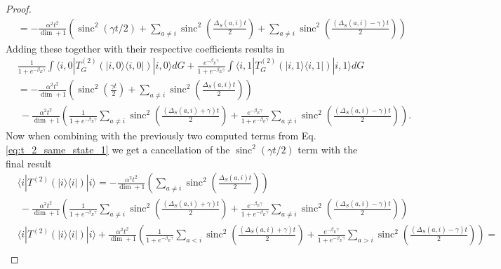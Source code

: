 \documentclass{article}
\newcommand{\ket}[1]{|#1\rangle}
\newcommand{\bra}[1]{\langle #1|}
\newcommand{\ketbra}[2]{| #1\rangle\! \langle #2|}
\newcommand{\parens}[1]{\left( #1 \right)}
\DeclareMathOperator{\sinc}{sinc}
\begin{document}
\begin{proof}
\begin{align}
        &=- \frac{\alpha^2 t^2}{\dim  + 1} \parens{\sinc^2 (\gamma t / 2) + \sum_{a \neq i} \sinc^2 \left( \frac{\Delta_S(a, i) t}{2} \right) + \sum_{a \neq i} \sinc^2\parens{\frac{(\Delta_S(a, i) - \gamma)t}{2}} }
    \end{align}
    Adding these together with their respective coefficients results in
    \begin{align}
        &\frac{1}{1 + e^{-\beta_E \gamma}} \int \bra{i, 0} T^{(2)}_G (\ketbra{i, 0}{i, 0}) \ket{i, 0} dG + \frac{e^{-\beta_E \gamma}}{1 + e^{-\beta_E \gamma}} \int \bra{i, 1} T^{(2)}_G (\ketbra{i, 1}{i, 1}) \ket{i, 1} dG \\
        &= - \frac{\alpha^2 t^2}{\dim + 1} \left( \sinc^2\parens{\frac{\gamma t}{2}} + \sum_{a \neq i} \sinc^2\parens{\frac{\Delta_S(a,i)t}{2}} \right) \nonumber \\
        &~ - \frac{\alpha^2 t^2}{\dim + 1} \left( \frac{1}{1 + e^{-\beta_E \gamma}}\sum_{a \neq i} \sinc^2\parens{\frac{(\Delta_S(a, i) +\gamma)t}{2}}  + \frac{e^{-\beta_E \gamma}}{1 + e^{-\beta_E \gamma}}\sum_{a \neq i} \sinc^2\parens{\frac{(\Delta_S(a, i) -\gamma)t}{2}} \right).
    \end{align}
    Now when combining with the previously two computed terms from Eq. \eqref{eq:t_2_same_state_1} we get a cancellation of the $\sinc^2(\gamma t/ 2)$ term with the final result
    \begin{align}
        &\bra{i} T^{(2)}(\ketbra{i}{i})\ket{i} = - \frac{\alpha^2 t^2}{\dim + 1} \left(\sum_{a \neq i} \sinc^2\parens{\frac{\Delta_S(a,i)t}{2}}  \right) \nonumber \\
        &~ - \frac{\alpha^2 t^2}{\dim + 1} \left( \frac{1}{1 + e^{-\beta_E \gamma}}\sum_{a \neq i} \sinc^2\parens{\frac{(\Delta_S(a, i) +\gamma)t}{2}}  + \frac{e^{-\beta_E \gamma}}{1 + e^{-\beta_E \gamma}}\sum_{a \neq i} \sinc^2\parens{\frac{(\Delta_S(a, i) -\gamma)t}{2}} \right) \\
        &\bra{i} T^{(2)}(\ketbra{i}{i})\ket{i} + \frac{\alpha^2 t^2}{\dim + 1} \left( \frac{1}{1 + e^{-\beta_E \gamma}}\sum_{a < i} \sinc^2\parens{\frac{(\Delta_S(a, i) +\gamma)t}{2}}  + \frac{e^{-\beta_E \gamma}}{1 + e^{-\beta_E \gamma}}\sum_{a > i} \sinc^2\parens{\frac{(\Delta_S(a, i) -\gamma)t}{2}} \right) = \nonumber \\

\end{align}
\end{proof}
\end{document}
